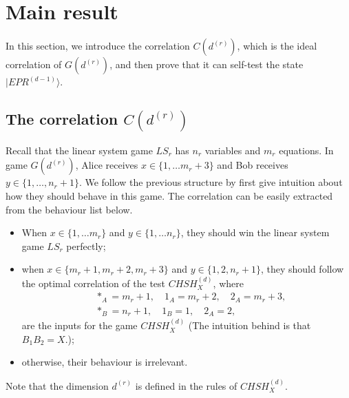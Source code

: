 \documentclass[11pt,letterpaper]{article}
\newcommand{\ket}[1]{|#1\rangle}
\newcommand{\1}{\mathbb{1}}
\newcommand{\CHSH}{CHSH^{(d)}}
\newcommand{\EPR}[1]{EPR^{(#1)}}
\newcommand{\G}{G}
\newcommand{\LS}{LS}
\newcommand{\dr}[1]{d^{(#1)}}
\theoremstyle{definition}
\begin{document}
\section{Main result}
\label{sec:main}
In this section, we introduce the correlation $C(\dr{r})$, which is the
ideal correlation of $\G(\dr{r})$, and then
prove that it can self-test the state $\ket{\EPR{d-1}}$.

\subsection{The correlation $C(\dr{r})$}
Recall that the linear system game $\LS_r$ has $n_r$ variables and $m_r$ equations.
In game $\G(\dr{r})$, 
Alice receives $x \in \{1,\dots m_r+3 \}$ and Bob receives
$y \in \{1,\dots,n_r+1\}$. We follow the previous structure by first give intuition about how they should
behave in this game. The correlation can be easily extracted from the behaviour list below.
\begin{itemize}
	\item When $x \in \{1,\dots m_r\}$ and $y \in \{1, \dots n_r\}$, they should win the 
	linear system game $\LS_r$ perfectly;
	\item when $x \in \{m_r+1, m_r+2, m_r+3\}$ and $y \in \{1, 2, n_r+1\}$, they should follow the
	optimal correlation of the test $\CHSH_X$, where 
	\begin{align}
		&\ast_A = m_r+1, \quad 1_A = m_r+2,\quad 2_A = m_r+3,\\
		&\ast_B = n_r+1,\quad 1_B = 1, \quad 2_A = 2,
	\end{align}
	are the inputs for the game $\CHSH_X$
	(The intuition behind is that $B_1B_2 = X$.);
	\item otherwise, their behaviour is irrelevant.
\end{itemize}
Note that the dimension $\dr{r}$ is defined in the rules of $\CHSH_X$.
\end{document}
